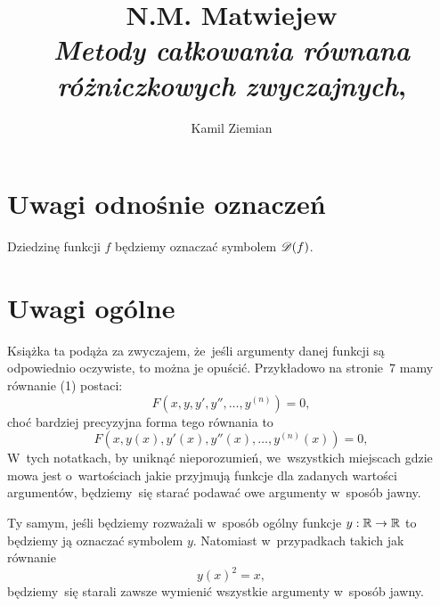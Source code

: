 \documentclass[a4paper,11pt]{article}
\title{N.M. Matwiejew \\
  \textit{Metody całkowania równana różniczkowych zwyczajnych},
  \cite{MatwiejewMetodyCalkowaniaRownanRozniczkowychZwyczajnych1986}}
\author{Kamil Ziemian}
\numberwithin{equation}{section}
\begin{document}





\maketitle





\section{Uwagi odnośnie oznaczeń}

\label{sec:Uwagi-odnosnie-oznaczen}



\noindent
Dziedzinę funkcji $f$ będziemy oznaczać symbolem $\mathcal{D}( f )$.

\VerSpaceFour





\section{Uwagi ogólne}

\label{sec:Uwagi-ogolne}



Książka ta podąża za zwyczajem, że~jeśli argumenty danej funkcji są
odpowiednio oczywiste, to można je opuścić. Przykładowo na stronie~7
mamy równanie (1) postaci:
\begin{equation}
  \label{eq:Uwagi-ogolne-01}
  F\left( x, y, y', y'', \ldots, y^{ ( n ) } \right) = 0,
\end{equation}
choć bardziej precyzyjna forma tego równania to
\begin{equation}
  \label{eq:Uwagi-ogolne-02}
  F\left( x, y( x ), y'( x ), y''( x ), \ldots, y^{ ( n ) }( x ) \right) = 0,
\end{equation}
W~tych notatkach, by uniknąć nieporozumień, we~wszystkich miejscach gdzie
mowa jest o~wartościach jakie przyjmują funkcje dla zadanych wartości
argumentów, będziemy~się starać podawać owe argumenty w~sposób jawny.

Ty samym, jeśli będziemy rozważali w~sposób ogólny funkcje
$y : \mathbb{R} \to \mathbb{R}$ to będziemy ją oznaczać symbolem $y$. Natomiast
w~przypadkach takich jak równanie
\begin{equation}
  \label{eq:Uwagi-ogolne-03}
  y( x )^{ 2 } = x,
\end{equation}
będziemy~się starali zawsze wymienić wszystkie argumenty w~sposób jawny.
\end{document}
